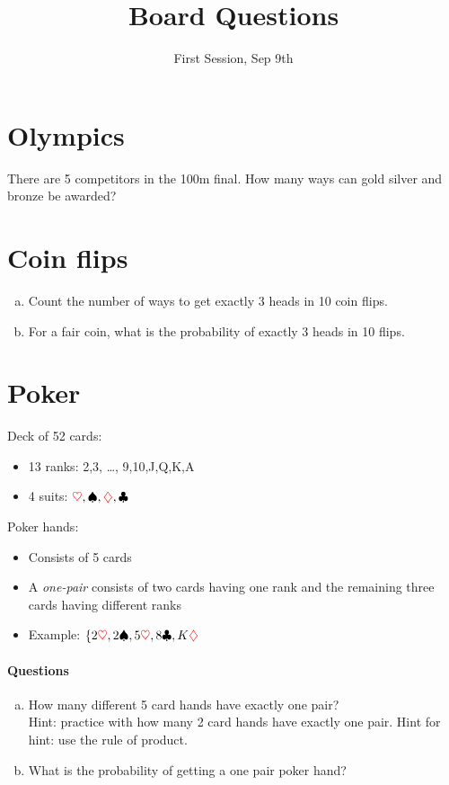 \documentclass[11p,a4paper]{article}
\title{Board Questions}
\date{First Session, Sep 9th}
\begin{document}
\maketitle

\section{Olympics}
There are 5 competitors in the 100m final. How many ways can
gold silver and bronze be awarded?

\section{Coin flips}
\begin{enumerate}[a)]
\item Count the number of ways to get exactly 3 heads in 10 coin flips.
\item For a fair coin, what is the probability of exactly 3 heads in 10 flips.
\end{enumerate}

\section{Poker}
Deck of 52 cards:
\begin{itemize}
\item 13 ranks: 2,3, \ldots, 9,10,J,Q,K,A
\item 4 suits:  $ {\color{red} \heartsuit}, \spadesuit , {\color{red} \diamondsuit}, \clubsuit $
\end{itemize}
Poker hands:
\begin{itemize}
\item Consists of 5 cards
\item A \textit{one-pair} consists of two cards having one rank and the remaining three cards having 
different ranks
\item Example: $ \{2{\color{red} \heartsuit}, 2\spadesuit, 5{\color{red} \heartsuit}, 8\clubsuit, K{\color{red} \diamondsuit}  $
\end{itemize}

\paragraph{Questions}
\begin{enumerate}[a)]
\item How many different 5 card hands have exactly one pair? \\
Hint: practice with how many 2 card hands have exactly one pair.
Hint for hint: use the rule of product.
\item What is the probability of getting a one pair poker hand?
\end{enumerate}
\end{document}
